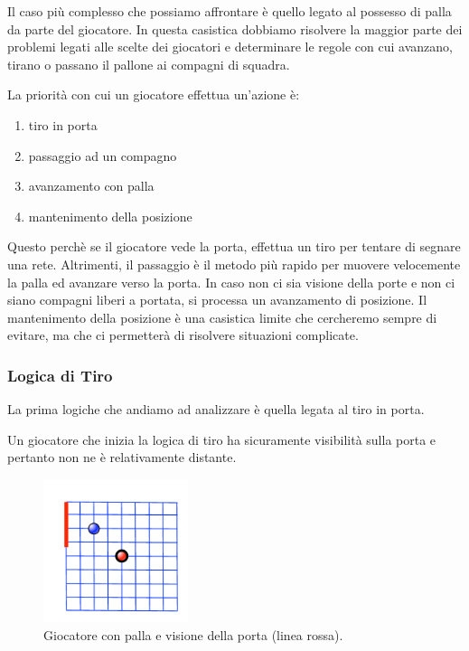 \documentclass[aps,letterpaper,10pt]{article}
\begin{document}
Il caso pi\`u complesso che possiamo affrontare \`e quello legato al possesso di palla da parte del giocatore. In questa casistica dobbiamo risolvere la maggior parte dei problemi legati alle scelte dei giocatori e determinare le regole con cui avanzano, tirano o passano il pallone ai compagni di squadra. \vspace{3mm}

La priorit\`a con cui un giocatore effettua un'azione \`e:

\begin{enumerate}
	\item tiro in porta
	\item passaggio ad un compagno
	\item avanzamento con palla
	\item mantenimento della posizione
\end{enumerate}

Questo perch\`e se il giocatore vede la porta, effettua un tiro per tentare di segnare una rete. Altrimenti, il passaggio \`e il metodo pi\`u rapido per muovere velocemente la palla ed avanzare verso la porta. In caso non ci sia visione della porte e non ci siano compagni liberi a portata, si processa un avanzamento di posizione. Il mantenimento della posizione \`e una casistica limite che cercheremo sempre di evitare, ma che ci permetter\`a di risolvere situazioni complicate.

\subsubsection{Logica di Tiro}
\label{tiro}

La prima logiche che andiamo ad analizzare \`e quella legata al tiro in porta. \vspace{3mm}

Un giocatore che inizia la logica di tiro ha sicuramente visibilit\`a sulla porta e pertanto non ne \`e relativamente distante.

\begin{figure}[H]
	\begin{center}
		\includegraphics[width=160px]{images/vision1.pdf}
	\end{center}
\caption{Giocatore con palla e visione della porta (linea rossa).}
\end{figure}
\end{document}

